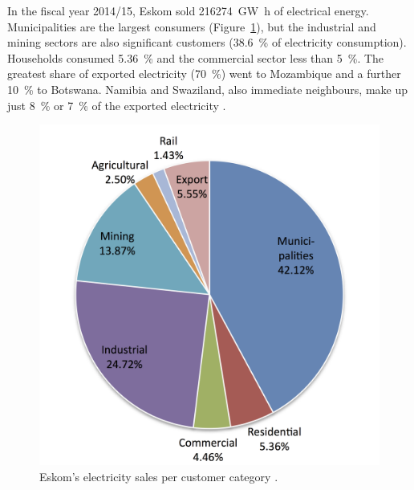 In the fiscal year 2014/15, Eskom sold \SI{216274}{\giga\watt\hour} of electrical energy. Municipalities are the largest consumers (Figure~\ref{ElectricityShare}), but the industrial and mining sectors are also significant customers (\SI{38.6}{\percent} of electricity consumption). Households consumed \SI{5.36}{\percent} and the commercial sector less than \SI{5}{\percent}. The greatest share of exported electricity (\SI{70}{\percent}) went to Mozambique and a further \SI{10}{\percent} to Botswana. Namibia and Swaziland, also immediate neighbours, make up just \SI{8}{\percent} or \SI{7}{\percent} of the exported electricity \cite{Eskom2015b}.
\begin{figure}[!h] 
\centering
\includegraphics[width=0.5\linewidth]{FIG/ElectricityShare}
\caption[Eskom's electricity sales per customer category.]{Eskom's electricity sales per customer category \cite{Eskom2015b}.}\label{ElectricityShare}
\end{figure}
\pagebreak
